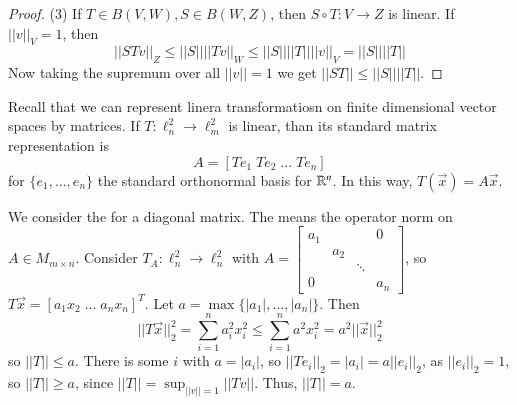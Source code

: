 \begin{proof}
    (3) If $T \in B(V,W), S \in B(W,Z)$, then $S\circ T:V\rightarrow Z$ is linear. If $||v||_V = 1$, then $$||STv||_Z \leq ||S||||Tv||_W \leq ||S||||T||||v||_V = ||S||||T||$$ Now taking the supremum over all $||v|| = 1$ we get $||ST|| \leq ||S||||T||$.
\end{proof}

\begin{rec}
    Recall that we can represent linera transformatiosn on finite dimensional vector spaces by matrices. If $T:\ell_n^2\rightarrow \ell_m^2$ is linear, than its standard matrix representation is $$A = [Te_1\;Te_2\;...\;Te_n]$$ for $\{e_1,...,e_n\}$ the standard orthonormal basis for $\mathbb R^n$. In this way, $T(\vec{x}) = A\vec{x}$.
\end{rec}

\begin{eg}
    We consider the  for a diagonal matrix. The  means the operator norm on $A \in M_{m\times n}$. Consider $T_A:\ell_n^2\rightarrow \ell_n^2$ with $A = \begin{bmatrix} a_1 & & & 0 \\ & a_2 & & \\ & & \ddots & \\ 0 & & & a_n\end{bmatrix}$, so $T\vec{x} = [a_1x_2\;...\;a_nx_n]^T$. Let $a = \max\{|a_1|,...,|a_n|\}$. Then $$||T\vec{x}||_2^2 = \sum_{i=1}^na_i^2x_i^2 \leq \sum_{i=1}^na^2x_i^2 = a^2||\vec{x}||_2^2$$ so $||T|| \leq a$. There is some $i$ with $a = |a_i|$, so $||Te_i||_2 =|a_i| = a||e_i||_2$, as $||e_i||_2 = 1$, so $||T|| \geq a$, since $||T|| = \sup_{||v|| = 1}||Tv||$. Thus, $||T|| = a$.
\end{eg}

